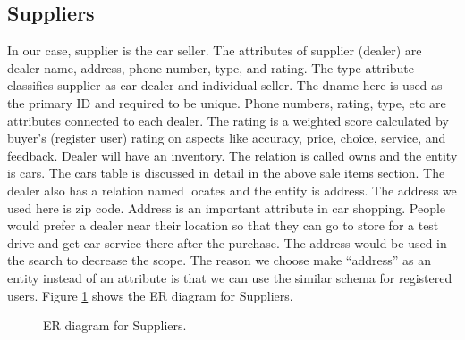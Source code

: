 \documentclass[12pt]{article}
\begin{document}
\subsection{Suppliers}
In our case, supplier is the car seller. The attributes of supplier (dealer) are dealer name, address, phone number, type, and rating. The type attribute classifies supplier as car dealer and individual seller. The dname here is used as the primary ID and required to be unique. Phone numbers, rating, type, etc are attributes connected to each dealer. The rating is a weighted score calculated by buyer's (register user) rating on aspects like accuracy, price, choice, service, and feedback. Dealer will have an inventory. The relation is called owns and the entity is cars. The cars table is discussed in detail in the above sale items section. The dealer also has a relation named locates and the entity is address. The address we used here is zip code. Address is an important attribute in car shopping. People would prefer a dealer near their location so that they can go to store for a test drive and get car service there after the purchase. The address would be used in the search to decrease the scope. The reason we choose make ``address'' as an entity instead of an attribute is that we can use the similar schema for registered users. Figure \ref{fig:ERSupp} shows the ER diagram for Suppliers.\\
\begin{figure}[!h]
\caption{ER diagram for Suppliers.\label{fig:ERSupp}}
\begin{center}
\end{center}
\end{figure}
\end{document}
